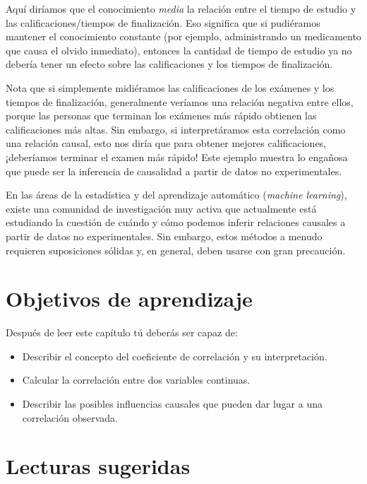 \documentclass[
  12pt,
]{book}
\providecommand{\tightlist}{%
  \setlength{\itemsep}{0pt}\setlength{\parskip}{0pt}}
\begin{document}
Aquí diríamos que el conocimiento \emph{media} la relación entre el tiempo de estudio y las calificaciones/tiempos de finalización. Eso significa que si pudiéramos mantener el conocimiento constante (por ejemplo, administrando un medicamento que causa el olvido inmediato), entonces la cantidad de tiempo de estudio ya no debería tener un efecto sobre las calificaciones y los tiempos de finalización.

Nota que si simplemente midiéramos las calificaciones de los exámenes y los tiempos de finalización, generalmente veríamos una relación negativa entre ellos, porque las personas que terminan los exámenes más rápido obtienen las calificaciones más altas. Sin embargo, si interpretáramos esta correlación como una relación causal, esto nos diría que para obtener mejores calificaciones, ¡deberíamos terminar el examen más rápido! Este ejemplo muestra lo engañosa que puede ser la inferencia de causalidad a partir de datos no experimentales.

En las áreas de la estadística y del aprendizaje automático (\emph{machine learning}), existe una comunidad de investigación muy activa que actualmente está estudiando la cuestión de cuándo y cómo podemos inferir relaciones causales a partir de datos no experimentales. Sin embargo, estos métodos a menudo requieren suposiciones sólidas y, en general, deben usarse con gran precaución.

\hypertarget{objetivos-de-aprendizaje-12}{%
\section{Objetivos de aprendizaje}\label{objetivos-de-aprendizaje-12}}

Después de leer este capítulo tú deberás ser capaz de:

\begin{itemize}
\tightlist
\item
  Describir el concepto del coeficiente de correlación y su interpretación.
\item
  Calcular la correlación entre dos variables continuas.
\item
  Describir las posibles influencias causales que pueden dar lugar a una correlación observada.
\end{itemize}

\hypertarget{lecturas-sugeridas-8}{%
\section{Lecturas sugeridas}\label{lecturas-sugeridas-8}}
\end{document}
